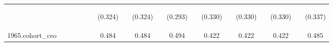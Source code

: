 \begin{center}
\begin{tabular}{lcccccccccccccccccc}
\vspace{4pt} & \begin{footnotesize}\end{footnotesize} & \begin{footnotesize}\end{footnotesize} & \begin{footnotesize}\end{footnotesize} & \begin{footnotesize}\end{footnotesize} & \begin{footnotesize}\end{footnotesize} & \begin{footnotesize}(0.324)\end{footnotesize} & \begin{footnotesize}\end{footnotesize} & \begin{footnotesize}(0.324)\end{footnotesize} & \begin{footnotesize}\end{footnotesize} & \begin{footnotesize}(0.293)\end{footnotesize} & \begin{footnotesize}\end{footnotesize} & \begin{footnotesize}(0.330)\end{footnotesize} & \begin{footnotesize}\end{footnotesize} & \begin{footnotesize}(0.330)\end{footnotesize} & \begin{footnotesize}\end{footnotesize} & \begin{footnotesize}(0.330)\end{footnotesize} & \begin{footnotesize}\end{footnotesize} & \begin{footnotesize}(0.337)\end{footnotesize} \\
1965.cohort\_ceo &  &  &  &  &  & 0.484 &  & 0.484 &  & 0.494 &  & 0.422 &  & 0.422 &  & 0.422 &  & 0.485 \\

\end{tabular}
\end{center}
